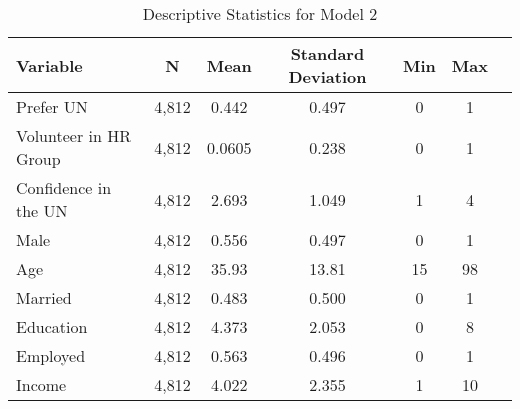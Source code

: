 \begin{table}[h!]\centering
\caption{Descriptive Statistics for Model 2}
\begin{tabular}{l*{6}{c}}
\hline\hline
Variable & N & Mean & Standard Deviation & Min & Max \\ \hline
Prefer UN & 4,812 & 0.442 & 0.497 & 0 & 1 \\
Volunteer in HR Group & 4,812 & 0.0605 & 0.238 & 0 & 1 \\
Confidence in the UN & 4,812 & 2.693 & 1.049 & 1 & 4 \\
Male & 4,812 & 0.556 & 0.497 & 0 & 1 \\
Age & 4,812 & 35.93 & 13.81 & 15 & 98 \\
Married & 4,812 & 0.483 & 0.500 & 0 & 1 \\
Education & 4,812 & 4.373 & 2.053 & 0 & 8 \\
Employed & 4,812 & 0.563 & 0.496 & 0 & 1 \\
Income & 4,812 & 4.022 & 2.355 & 1 & 10 \\
\hline
\end{tabular}
\end{table}

